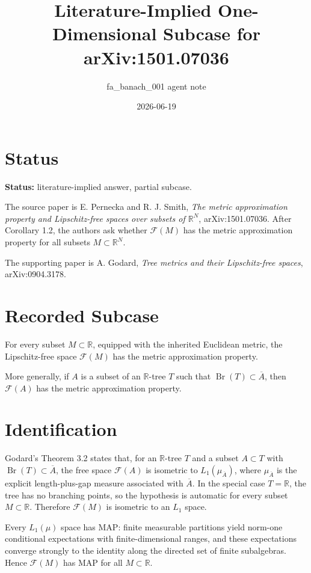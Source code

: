 \documentclass[11pt]{article}
\title{Literature-Implied One-Dimensional Subcase for arXiv:1501.07036}
\author{fa\_banach\_001 agent note}
\date{2026-06-19}
\newcommand{\F}{\mathcal F}
\newcommand{\R}{\mathbb R}
\newcommand{\MAP}{\mathrm{MAP}}
\begin{document}
\maketitle

\section*{Status}

\textbf{Status:} literature-implied answer, partial subcase.

The source paper is E. Pernecka and R. J. Smith,
\emph{The metric approximation property and Lipschitz-free spaces over subsets
of \(\R^N\)}, arXiv:1501.07036.  After Corollary 1.2, the authors ask whether
\(\F(M)\) has the metric approximation property for all subsets
\(M\subset \R^N\).

The supporting paper is A. Godard, \emph{Tree metrics and their
Lipschitz-free spaces}, arXiv:0904.3178.

\section*{Recorded Subcase}

For every subset \(M\subset \R\), equipped with the inherited Euclidean
metric, the Lipschitz-free space \(\F(M)\) has the metric approximation
property.

More generally, if \(A\) is a subset of an \(\R\)-tree \(T\) such that
\(\operatorname{Br}(T)\subset \overline A\), then \(\F(A)\) has the metric
approximation property.

\section*{Identification}

Godard's Theorem 3.2 states that, for an \(\R\)-tree \(T\) and a subset
\(A\subset T\) with \(\operatorname{Br}(T)\subset \overline A\), the free space
\(\F(A)\) is isometric to \(L_1(\mu_{\overline A})\), where
\(\mu_{\overline A}\) is the explicit length-plus-gap measure associated with
\(\overline A\).  In the special case \(T=\R\), the tree has no branching
points, so the hypothesis is automatic for every subset \(M\subset\R\).
Therefore \(\F(M)\) is isometric to an \(L_1\) space.

Every \(L_1(\mu)\) space has \(\MAP\): finite measurable partitions yield
norm-one conditional expectations with finite-dimensional ranges, and these
expectations converge strongly to the identity along the directed set of
finite subalgebras.  Hence \(\F(M)\) has \(\MAP\) for all \(M\subset\R\).
\end{document}
